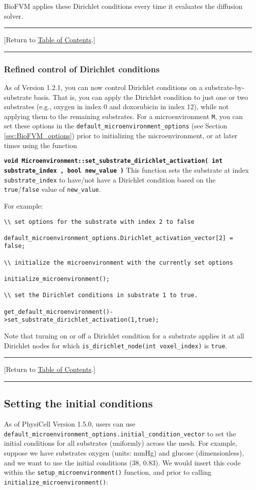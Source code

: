 \documentclass[12pt]{article}
\renewcommand{\v}{\verb}
\newcommand{\smallcode}[1]{\textbf{\texttt{#1}}}
\newcommand{\TOClink}{\begin{center}\hrule\vskip-5pt\phantom{.}\hfill[Return to \hyperlink{TOC}{Table of Contents}.]\hfill\phantom{.}\vskip3pt\hrule\end{center}}
\begin{document}
BioFVM applies these Dirichlet conditions every time it 
evaluates the diffusion solver.

\TOClink

\subsubsection{Refined control of Dirichlet conditions}
\label{sec:refined_Dirichlet_conditions}

As of Version 1.2.1, you can now control Dirichlet conditions on a 
substrate-by-substrate basis. That is, you can apply the Dirichlet condition to just one or two 
substrates (e.g., oxygen in index 0 and doxorubicin in index 12), while not applying them 
to the remaining substrates. For a microenvironment \v|M|, you can set these options 
in the \v|default_microenvironment_options| (see Section \ref{sec:BioFVM_options}) prior to initializing 
the microenvironment, or at later times using the function 

\smallcode{void Microenvironment::set\_substrate\_dirichlet\_activation( int substrate\_index , bool new\_value )} 
This function sets the substrate at index \v|substrate_index| to have/not have a Dirichlet condition 
based on the \v|true|/\v|false| value of \v|new_value|.


For example: 
\begin{verbatim}
\\ set options for the substrate with index 2 to false 

default_microenvironment_options.Dirichlet_activation_vector[2] = false; 

\\ initialize the microenvironment with the currently set options 

initialize_microenvironment(); 

\\ set the Dirichlet conditions in substrate 1 to true. 

get_default_microenvironment()->set_substrate_dirichlet_activation(1,true); 
\end{verbatim}

Note that turning on or off a Dirichlet condition for a substrate applies it at all Dirichlet nodes for 
which \v|is_dirichlet_node(int voxel_index)| is \v|true|. 

\TOClink

\subsection{Setting the initial conditions}
\label{sec:BioFVM_initial_conditions}
As of PhysiCell Version 1.5.0, users can use \v|default_microenvironment_options.initial_condition_vector|  
to set the initial conditions for all substrates (uniformly) across the mesh. For example, 
suppose we have substrates oxygen (units: mmHg) and glucose (dimensionless), and we 
want to use the initial conditions (38, 0.83). We would insert this code within 
the \v|setup_microenvironment()| function, and prior to calling 
\v|initialize_microenvironment()|: 
\end{document}
